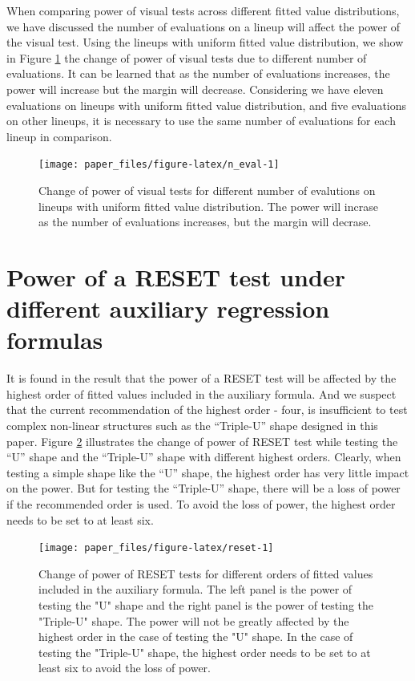 \documentclass[]{interact}
\theoremstyle{plain}%
\theoremstyle{definition}
\theoremstyle{remark}
\begin{document}
When comparing power of visual tests across different fitted value
distributions, we have discussed the number of evaluations on a lineup
will affect the power of the visual test. Using the lineups with uniform
fitted value distribution, we show in Figure \ref{fig:n_eval} the change
of power of visual tests due to different number of evaluations. It can
be learned that as the number of evaluations increases, the power will
increase but the margin will decrease. Considering we have eleven
evaluations on lineups with uniform fitted value distribution, and five
evaluations on other lineups, it is necessary to use the same number of
evaluations for each lineup in comparison.

\begin{figure}

{\centering \texttt{[image: paper\_files/figure-latex/n\_eval-1]} 

}

\caption{Change of power of visual tests for different number of evalutions on lineups with uniform fitted value distribution. The power will incrase as the number of evaluations increases, but the margin will decrase.}\label{fig:n_eval}
\end{figure}

\hypertarget{power-of-a-reset-test-under-different-auxiliary-regression-formulas}{%
\section{Power of a RESET test under different auxiliary regression
formulas}\label{power-of-a-reset-test-under-different-auxiliary-regression-formulas}}

It is found in the result that the power of a RESET test will be
affected by the highest order of fitted values included in the auxiliary
formula. And we suspect that the current recommendation of the highest
order - four, is insufficient to test complex non-linear structures such
as the ``Triple-U'' shape designed in this paper. Figure \ref{fig:reset}
illustrates the change of power of RESET test while testing the ``U''
shape and the ``Triple-U'' shape with different highest orders. Clearly,
when testing a simple shape like the ``U'' shape, the highest order has
very little impact on the power. But for testing the ``Triple-U'' shape,
there will be a loss of power if the recommended order is used. To avoid
the loss of power, the highest order needs to be set to at least six.

\begin{figure}

{\centering \texttt{[image: paper\_files/figure-latex/reset-1]} 

}

\caption{Change of power of RESET tests for different orders of fitted values included in the auxiliary formula. The left panel is the power of testing the "U" shape and the right panel is the power of testing the "Triple-U" shape. The power will not be greatly affected by the highest order in the case of testing the "U" shape. In the case of testing the "Triple-U" shape, the highest order needs to be set to at least six to avoid the loss of power.}\label{fig:reset}
\end{figure}

\clearpage



\end{document}
